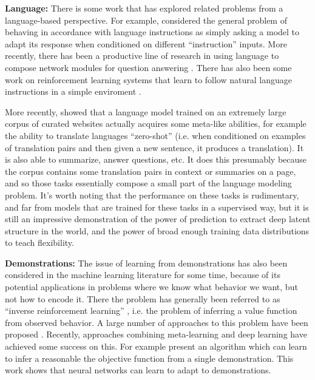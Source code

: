 \documentclass[11pt]{article}
\begin{document}
\textbf{Language:} There is some work that has explored related problems from a language-based perspective. For example, \citet{Larochelle2008} considered the general problem of behaving in accordance with language instructions as simply asking a model to adapt its response when conditioned on different ``instruction'' inputs. More recently, there has been a productive line of research in using language to compose network modules for question answering \citep{Andreas, Andreasa}. There has also been some work on reinforcement learning systems that learn to follow natural language instructions in a simple enviroment \citep{Hermann2017}. \par
More recently, \citet{Radford2019} showed that a language model trained on an extremely large corpus of curated websites actually acquires some meta-like abilities, for example the ability to translate languages ``zero-shot'' (i.e. when conditioned on examples of translation pairs and then given a new sentence, it produces a translation). It is also able to summarize, answer questions, etc. It does this presumably because the corpus contains some translation pairs in context or summaries on a page, and so those tasks essentially compose a small part of the language modeling problem. It's worth noting that the performance on these tasks is rudimentary, and far from models that are trained for these tasks in a supervised way, but it is still an impressive demonstration of the power of prediction to extract deep latent structure in the world, and the power of broad enough training data distributions to teach flexibility. \par  
\textbf{Demonstrations:} The issue of learning from demonstrations has also been considered in the machine learning literature for some time, because of its potential applications in problems where we know what behavior we want, but not how to encode it. There the problem has generally been referred to as ``inverse reinforcement learning'' \citep{Ng2000}, i.e. the problem of inferring a value function from observed behavior. A large number of approaches to this problem have been proposed \citep[e.g.]{Ng2000, Abbeel2004}. Recently, approaches combining meta-learning and deep learning have achieved some success on this. For example \citet{Finn2016} present an algorithm which can learn to infer a reasonable the objective function from a single demonstration. This work shows that neural networks can learn to adapt to demonstrations. \par
\end{document}
